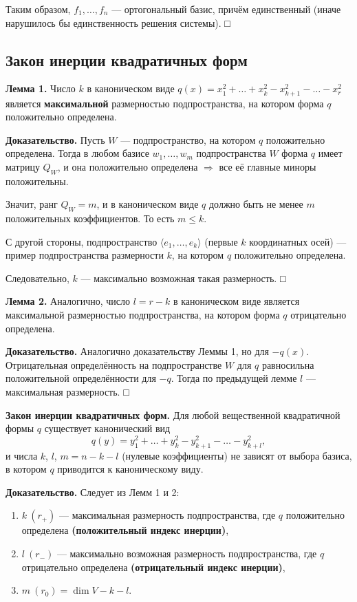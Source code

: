 \documentclass[12pt]{article}
\begin{document}
Таким образом, $f_1, \dots, f_n$ — ортогональный базис, причём единственный (иначе нарушилось бы единственность решения системы). □

\subsection{Закон инерции квадратичных форм}

\textbf{Лемма 1.} Число $k$ в каноническом виде $q(x) = x_1^2 + \dots + x_k^2 - x_{k+1}^2 - \dots - x_r^2$ является \textbf{максимальной} размерностью подпространства, на котором форма $q$ положительно определена.

\textbf{Доказательство.}  
Пусть $W$ — подпространство, на котором $q$ положительно определена. Тогда в любом базисе $w_1, \dots, w_m$ подпространства $W$ форма $q$ имеет матрицу $Q_W$, и она положительно определена $\Rightarrow$ все её главные миноры положительны.

Значит, ранг $Q_W = m$, и в каноническом виде $q$ должно быть не менее $m$ положительных коэффициентов. То есть $m \leq k$.

С другой стороны, подпространство $\langle e_1, \dots, e_k \rangle$ (первые $k$ координатных осей) — пример подпространства размерности $k$, на котором $q$ положительно определена.

Следовательно, $k$ — максимально возможная такая размерность. □

\textbf{Лемма 2.} Аналогично, число $l = r - k$ в каноническом виде является максимальной размерностью подпространства, на котором форма $q$ отрицательно определена.

\textbf{Доказательство.}  
Аналогично доказательству Леммы 1, но для $-q(x)$. Отрицательная определённость на подпространстве $W$ для $q$ равносильна положительной определённости для $-q$. Тогда по предыдущей лемме $l$ — максимальная размерность. □

\textbf{Закон инерции квадратичных форм.} Для любой вещественной квадратичной формы $q$ существует канонический вид
\[
q(y) = y_1^2 + \dots + y_k^2 - y_{k+1}^2 - \dots - y_{k+l}^2,
\]
и числа $k$, $l $, $m = n - k-l$ (нулевые коэффициенты) не зависят от выбора базиса, в котором $q$ приводится к каноническому виду.

\textbf{Доказательство.}  
Следует из Лемм 1 и 2:
\begin{enumerate}
    \item $k \ (r_+)$ — максимальная размерность подпространства, где $q$ положительно определена \textbf{(положительный индекс инерции)},
    \item $l \ (r_-)$ — максимально возможная размерность подпространства, где $q$ отрицательно определена \textbf{(отрицательный индекс инерции)},
    \item $m \ (r_0)= \dim V-k-l$.
\end{enumerate}
\end{document}
